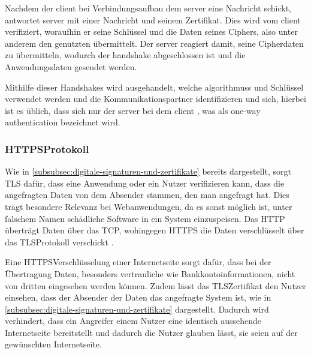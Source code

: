 Nachdem der \gls{client} bei Verbindungsaufbau dem \gls{server} eine Nachricht schickt, antwortet \gls{server} mit einer Nachricht und seinem Zertifikat.
Dies wird vom \gls{client} verifiziert, woraufhin er seine Schlüssel und die Daten seines Ciphers, also unter anderem den genutzten  übermittelt.
Der \gls{server} reagiert damit, seine Cipherdaten zu übermitteln, wodurch der \gls{handshake} abgeschlossen ist und die Anwendungsdaten gesendet werden.

Mithilfe dieser Handshakes wird ausgehandelt, welche  \glspl{algorithmus} und Schlüssel verwendet werden und die Kommunikationspartner identifizieren und  sich, hierbei ist es üblich, dass sich nur der \gls{server} bei dem \gls{client} , was als one-way authentication bezeichnet wird\autocite[\vglf][]{morrissey-tls-2010}.

\subsubsection[HTTPS-Protocol]{\ac{HTTPS}\nonbreakdash Protokoll}\label{subsubsec:HTTPS-Protocol}

Wie in \autoref{subsubsec:digitale-signaturen-und-zertifikate} bereits dargestellt, sorgt \ac{TLS} dafür, dass eine Anwendung oder ein Nutzer verifizieren kann, dass die angefragten Daten von dem Absender stammen, den man angefragt hat.
Dies trägt besondere Relevanz bei Webanwendungen, da es sonst möglich ist, unter falschem Namen schädliche Software in ein System einzuspeisen.
Das \ac{HTTP} überträgt Daten über das \ac{TCP}, wohingegen \ac{HTTPS} die Daten verschlüsselt über das \ac{TLS}\nonbreakdash Protokoll verschickt \autocites{2674005.2674991:online}{RFC5246T44:online}.

Eine \ac{HTTPS}\nonbreakdash Verschlüsselung einer Internetseite sorgt dafür, dass bei der Übertragung Daten, besonders vertrauliche wie \zb Bankkontoinformationen, nicht von dritten eingesehen werden können\autocite[\vglf][]{CloudfareWarumHTTPS:online}.
Zudem lässt das \ac{TLS}\nonbreakdash Zertifikat den Nutzer einsehen, dass der Absender der Daten das angefragte System ist, wie in \autoref{subsubsec:digitale-signaturen-und-zertifikate} dargestellt.
Dadurch wird verhindert, dass ein Angreifer einem Nutzer eine identisch aussehende Internetseite bereitstellt und dadurch die Nutzer glauben lässt, sie seien auf der gewünschten Internetseite\autocite[\vglf][]{CloudfareWarumHTTPS:online}.

